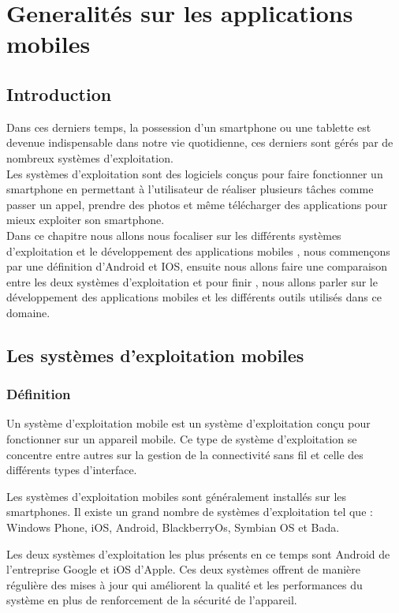 % 



\chapter{Generalités sur les applications mobiles}
\section{Introduction}
\tab Dans ces derniers temps, la possession d'un smartphone ou une tablette est devenue indispensable dans notre vie quotidienne, ces derniers sont gérés par de nombreux systèmes d'exploitation.\medskip
\\
Les systèmes d'exploitation sont des logiciels conçus pour faire fonctionner un smartphone en permettant à l'utilisateur de réaliser plusieurs tâches comme passer un appel, prendre des photos et même télécharger des applications pour mieux exploiter son smartphone.\medskip
\\
Dans ce chapitre nous allons nous focaliser sur les différents systèmes d'exploitation et le développement des applications mobiles , nous commençons par une définition d'Android et IOS, ensuite nous allons faire une comparaison entre les deux systèmes d'exploitation et pour finir , nous allons parler sur le développement des applications mobiles et les différents outils utilisés dans ce domaine.\medskip

\section{Les systèmes d'exploitation mobiles}
\subsection{Définition}
Un système d'exploitation mobile est un système d'exploitation conçu pour fonctionner sur un appareil mobile. Ce type de système d'exploitation se concentre entre autres sur la gestion de la connectivité sans fil et celle des différents types d'interface.~\cite{SystemeExploitationMobile}

Les systèmes d'exploitation mobiles sont généralement installés sur les smartphones. Il existe un grand nombre de systèmes d'exploitation tel que : Windows Phone, iOS, Android, BlackberryOs, Symbian OS et Bada.

Les deux systèmes d'exploitation les plus présents en ce temps sont Android de l'entreprise Google et iOS d'Apple. Ces deux systèmes offrent de manière régulière des mises à jour qui améliorent la qualité et les performances du système en plus de renforcement de la sécurité de l'appareil.
 

